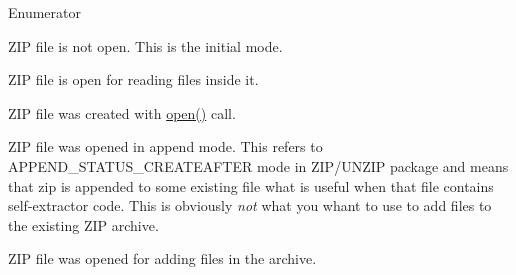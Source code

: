 \begin{Desc}
\item[Enumerator]\par
\begin{description}
\item[{\em 
\hypertarget{class_qua_zip_a47e28d4116ee716fdd6b431b821d0be4ac87ddb1e901e1ec700c16ee0d4d398ce}{md\-Not\-Open}\label{class_qua_zip_a47e28d4116ee716fdd6b431b821d0be4ac87ddb1e901e1ec700c16ee0d4d398ce}
}]Z\-I\-P file is not open. This is the initial mode. \item[{\em 
\hypertarget{class_qua_zip_a47e28d4116ee716fdd6b431b821d0be4a803a371910c2dc830d111e9ce5b58897}{md\-Unzip}\label{class_qua_zip_a47e28d4116ee716fdd6b431b821d0be4a803a371910c2dc830d111e9ce5b58897}
}]Z\-I\-P file is open for reading files inside it. \item[{\em 
\hypertarget{class_qua_zip_a47e28d4116ee716fdd6b431b821d0be4a25ae05b12590540af8c66ae8298b928e}{md\-Create}\label{class_qua_zip_a47e28d4116ee716fdd6b431b821d0be4a25ae05b12590540af8c66ae8298b928e}
}]Z\-I\-P file was created with \hyperlink{class_qua_zip_abfa4e6018b2964a3d10a4c54e5ab3962}{open()} call. \item[{\em 
\hypertarget{class_qua_zip_a47e28d4116ee716fdd6b431b821d0be4ab807f0c65653a16d77b365801fd25582}{md\-Append}\label{class_qua_zip_a47e28d4116ee716fdd6b431b821d0be4ab807f0c65653a16d77b365801fd25582}
}]Z\-I\-P file was opened in append mode. This refers to {\ttfamily A\-P\-P\-E\-N\-D\-\_\-\-S\-T\-A\-T\-U\-S\-\_\-\-C\-R\-E\-A\-T\-E\-A\-F\-T\-E\-R} mode in Z\-I\-P/\-U\-N\-Z\-I\-P package and means that zip is appended to some existing file what is useful when that file contains self-\/extractor code. This is obviously {\itshape not} what you whant to use to add files to the existing Z\-I\-P archive. \item[{\em 
\hypertarget{class_qua_zip_a47e28d4116ee716fdd6b431b821d0be4a22c745f349f06add449af523254fdaec}{md\-Add}\label{class_qua_zip_a47e28d4116ee716fdd6b431b821d0be4a22c745f349f06add449af523254fdaec}
}]Z\-I\-P file was opened for adding files in the archive. \end{description}
\end{Desc}


